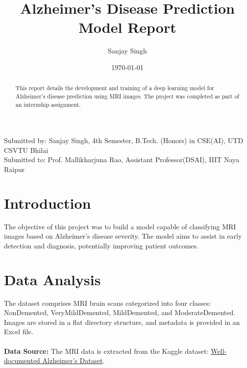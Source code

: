 \documentclass{article}
\title{Alzheimer's Disease Prediction Model Report}
\author{Sanjay Singh}
\date{\today}
\begin{document}
\maketitle

\begin{center}
Submitted by: Sanjay Singh, 4th Semester, B.Tech. (Honors) in CSE(AI), UTD CSVTU Bhilai \\
Submitted to: Prof. Mallikharjuna Rao, Assistant Professor(DSAI), IIIT Naya Raipur
\end{center}

\begin{abstract}
This report details the development and training of a deep learning model for Alzheimer's disease prediction using MRI images. The project was completed as part of an internship assignment.
\end{abstract}

\section{Introduction}
The objective of this project was to build a model capable of classifying MRI images based on Alzheimer's disease severity. The model aims to assist in early detection and diagnosis, potentially improving patient outcomes.

\section{Data Analysis}
The dataset comprises MRI brain scans categorized into four classes: NonDemented, VeryMildDemented, MildDemented, and ModerateDemented. Images are stored in a flat directory structure, and metadata is provided in an Excel file.\\
\\
\textbf{Data Source:} The MRI data is extracted from the Kaggle dataset: \href{https://www.kaggle.com/datasets/yiweilu2033/well-documented-alzheimers-dataset}{Well-documented Alzheimer's Dataset}.
\end{document}
